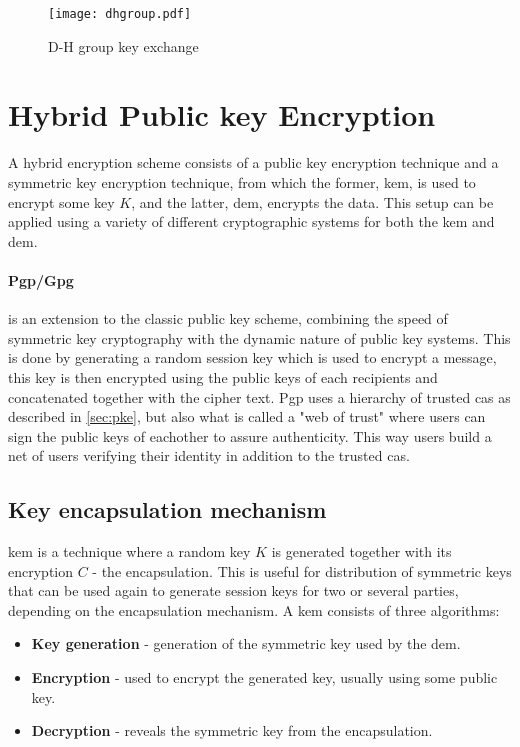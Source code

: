 \begin{figure}
\centering
\texttt{[image: dhgroup.pdf]}
\caption{D-H group key exchange}
\label{fig:dhgroup}
\end{figure}

\section{Hybrid Public key Encryption}\label{sec:hybrid}
A hybrid encryption scheme \cite{hybrid_enc} consists of a public key encryption technique and a symmetric key encryption technique, from which the former, \gls{kem}, is used to encrypt some key $K$, and the latter, \gls{dem}, encrypts the data. This setup can be applied using a variety of different cryptographic systems for both the \gls{kem} and \gls{dem}. 

\paragraph{Pgp/Gpg}\label{pgp}\cite{openpgp, koch2003gnu} is an extension to the classic public key scheme, combining the speed of symmetric key cryptography with the dynamic nature of public key systems. This is done by generating a random session key which is used to encrypt a message, this key is then encrypted using the public keys of each recipients and concatenated together with the cipher text. Pgp uses a hierarchy of trusted \glspl{ca} as described in \ref{sec:pke}, but also what is called a "web of trust" where users can sign the public keys of eachother to assure authenticity. This way users build a net of users verifying their identity in addition to the trusted \glspl{ca}.

\subsection{Key encapsulation mechanism}
\Gls{kem} \cite{kem_kurosawaP14} is a technique where a random key $K$ is generated together with its encryption $C$ - the encapsulation. This is useful for distribution of symmetric keys that can be used again to generate session keys for two or several parties, depending on the encapsulation mechanism. A \gls{kem} consists of three algorithms:
\begin{itemize}
\item \textbf{ Key generation } - generation of the symmetric key used by the \gls{dem}.
\item \textbf{ Encryption } - used to encrypt the generated key, usually using some public key.
\item \textbf{ Decryption } - reveals the symmetric key from the encapsulation.
\end{itemize}

